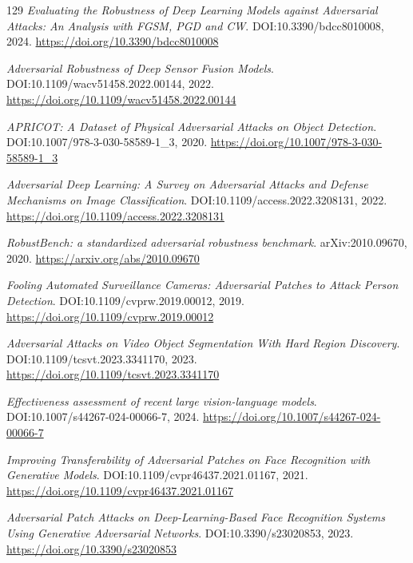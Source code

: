 \documentclass[11pt,a4paper]{article}
\begin{document}
\begin{thebibliography}{129}
\newblock \emph{Evaluating the Robustness of Deep Learning Models against Adversarial Attacks: An Analysis with FGSM, PGD and CW}.
\newblock DOI:10.3390/bdcc8010008, 2024.
\newblock \url{https://doi.org/10.3390/bdcc8010008}

\newblock \emph{Adversarial Robustness of Deep Sensor Fusion Models}.
\newblock DOI:10.1109/wacv51458.2022.00144, 2022.
\newblock \url{https://doi.org/10.1109/wacv51458.2022.00144}

\newblock \emph{APRICOT: A Dataset of Physical Adversarial Attacks on Object Detection}.
\newblock DOI:10.1007/978-3-030-58589-1\_3, 2020.
\newblock \url{https://doi.org/10.1007/978-3-030-58589-1_3}

\newblock \emph{Adversarial Deep Learning: A Survey on Adversarial Attacks and Defense Mechanisms on Image Classification}.
\newblock DOI:10.1109/access.2022.3208131, 2022.
\newblock \url{https://doi.org/10.1109/access.2022.3208131}

\newblock \emph{RobustBench: a standardized adversarial robustness benchmark}.
\newblock arXiv:2010.09670, 2020.
\newblock \url{https://arxiv.org/abs/2010.09670}

\newblock \emph{Fooling Automated Surveillance Cameras: Adversarial Patches to Attack Person Detection}.
\newblock DOI:10.1109/cvprw.2019.00012, 2019.
\newblock \url{https://doi.org/10.1109/cvprw.2019.00012}

\newblock \emph{Adversarial Attacks on Video Object Segmentation With Hard Region Discovery}.
\newblock DOI:10.1109/tcsvt.2023.3341170, 2023.
\newblock \url{https://doi.org/10.1109/tcsvt.2023.3341170}

\newblock \emph{Effectiveness assessment of recent large vision-language models}.
\newblock DOI:10.1007/s44267-024-00066-7, 2024.
\newblock \url{https://doi.org/10.1007/s44267-024-00066-7}

\newblock \emph{Improving Transferability of Adversarial Patches on Face Recognition with Generative Models}.
\newblock DOI:10.1109/cvpr46437.2021.01167, 2021.
\newblock \url{https://doi.org/10.1109/cvpr46437.2021.01167}

\newblock \emph{Adversarial Patch Attacks on Deep-Learning-Based Face Recognition Systems Using Generative Adversarial Networks}.
\newblock DOI:10.3390/s23020853, 2023.
\newblock \url{https://doi.org/10.3390/s23020853}


\end{thebibliography}
\end{document}
